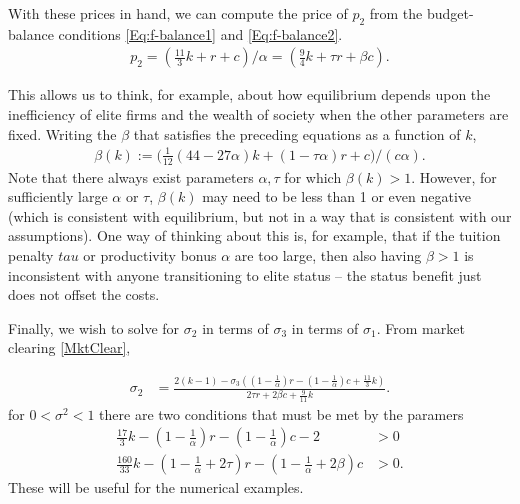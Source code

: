 \documentclass[12pt,letterpaper]{article}
\begin{document}
	With these prices in hand, we can compute the price of $p_2$ from the budget-balance conditions \eqref{Eq:f-balance1} and \eqref{Eq:f-balance2}.
	\begin{align}
		p_2=\left(\frac{11}{3}k+r+c\right)/\alpha
		=\left(\frac{9}{4}k+\tau r+\beta c\right).\label{PriceOf2}
	\end{align}
	
	This allows us to think, for example, about how equilibrium depends upon the inefficiency of elite firms and the wealth of society when the other parameters are fixed.
	Writing the $\beta$ that satisfies the preceding equations as a function of $k$,
	\begin{align}
		\beta(k):=\Big(\frac{1}{12}(44-27\alpha)k+(1-\tau\alpha)r+c\Big)/(c\alpha).
	\end{align}
	Note that there always exist parameters $\alpha,\tau$  for which  $\beta(k)>1$. 
	However, for sufficiently large $\alpha$ or $\tau$,  $\beta(k)$ may need to be less than 1 or even negative (which is consistent with equilibrium, but not in a way that is consistent with our assumptions).
	One way of thinking about this is, for example, that if the tuition penalty $tau$ or productivity bonus $\alpha$ are too large, then also having $\beta>1$ is inconsistent with anyone transitioning to elite status -- the status benefit just does not offset the costs.
	
	Finally, we wish to solve for $\sigma_2$ in terms of $\sigma_3$ in terms of $\sigma_1$. From market clearing \eqref{MktClear},
	
	\begin{align}
		\sigma_2&=
		\frac
		{
			2(k-1)
			-\sigma_3
			\left(
			(1-\frac{1}{\alpha})r
			-(1-\frac{1}{\alpha})c
			+\frac{11}{3}k
			\right)
		}
		{
			2\tau r  +2\beta c +\frac{9}{11}k
		}.\label{Sigma2}
	\end{align} 
	for $0<\sigma^2<1$ there are two conditions that must be met by the paramers
	\begin{align}
		\frac{17}{3}k-
		\left(
		1-\frac{1}{\alpha}
		\right)r-
		\left(
		1-\frac{1}{\alpha}
		\right)c-2
		&>0\label{Paramter Constraints 1}\\
		\frac{160}{33}k-
		\left(
		1-\frac{1}{\alpha}+2\tau
		\right)r-
		\left(
		1-\frac{1}{\alpha}+2\beta
		\right)c
		&>0.\label{Paramter Constraints 2}
	\end{align}
	These will be useful for the numerical examples.
	
\end{document}
